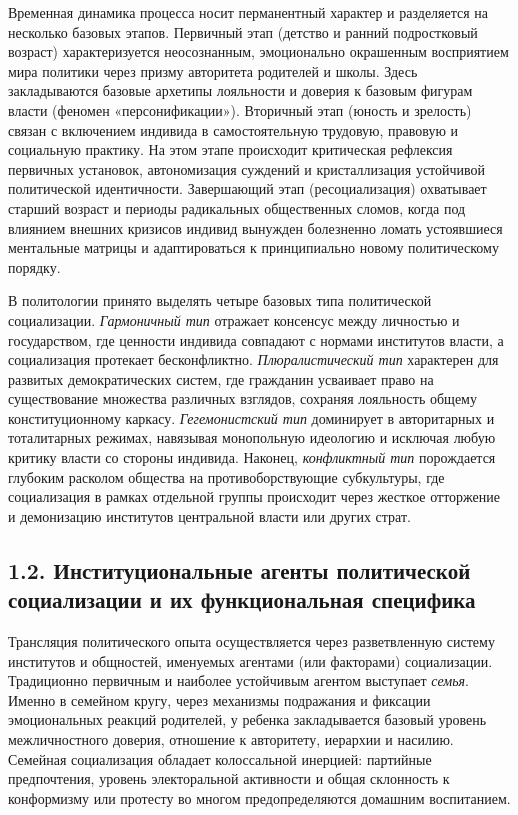 Временная динамика процесса носит перманентный характер и разделяется на несколько базовых этапов. Первичный этап (детство и ранний подростковый возраст) характеризуется неосознанным, эмоционально окрашенным восприятием мира политики через призму авторитета родителей и школы. Здесь закладываются базовые архетипы лояльности и доверия к базовым фигурам власти (феномен «персонификации»). Вторичный этап (юность и зрелость) связан с включением индивида в самостоятельную трудовую, правовую и социальную практику. На этом этапе происходит критическая рефлексия первичных установок, автономизация суждений и кристаллизация устойчивой политической идентичности. Завершающий этап (ресоциализация) охватывает старший возраст и периоды радикальных общественных сломов, когда под влиянием внешних кризисов индивид вынужден болезненно ломать устоявшиеся ментальные матрицы и адаптироваться к принципиально новому политическому порядку.

В политологии принято выделять четыре базовых типа политической социализации. \textit{Гармоничный тип} отражает консенсус между личностью и государством, где ценности индивида совпадают с нормами институтов власти, а социализация протекает бесконфликтно. \textit{Плюралистический тип} характерен для развитых демократических систем, где гражданин усваивает право на существование множества различных взглядов, сохраняя лояльность общему конституционному каркасу. \textit{Гегемонистский тип} доминирует в авторитарных и тоталитарных режимах, навязывая монопольную идеологию и исключая любую критику власти со стороны индивида. Наконец, \textit{конфликтный тип} порождается глубоким расколом общества на противоборствующие субкультуры, где социализация в рамках отдельной группы происходит через жесткое отторжение и демонизацию институтов центральной власти или других страт.

\subsection{1.2. Институциональные агенты политической социализации и их функциональная специфика}

Трансляция политического опыта осуществляется через разветвленную систему институтов и общностей, именуемых агентами (или факторами) социализации. Традиционно первичным и наиболее устойчивым агентом выступает \textit{семья}. Именно в семейном кругу, через механизмы подражания и фиксации эмоциональных реакций родителей, у ребенка закладывается базовый уровень межличностного доверия, отношение к авторитету, иерархии и насилию. Семейная социализация обладает колоссальной инерцией: партийные предпочтения, уровень электоральной активности и общая склонность к конформизму или протесту во многом предопределяются домашним воспитанием.

